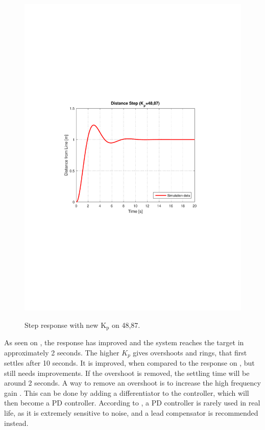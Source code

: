 \begin{figure}[H]
  \centering
  {
    \includegraphics[width=1.2\textwidth]{figures/distanceStep2.pdf}
  }
  \caption{Step response with new $\text{K}_\text{p}$ on 48,87.}
  \label{SimulationSteeringP2}
\end{figure}\vspace{-5mm}
As seen on , the response has improved and the system reaches the target in approximately 2 seconds. The higher $K_p$ gives overshoots and rings, that first settles after 10 seconds. It is improved, when compared to the response on , but still needs improvements. If the overshoot is removed, the settling time will be around 2 seconds. A way to remove an overshoot is to increase the high frequency gain \cite{KMNielsen}. This can be done by adding a differentiator to the controller, which will then become a PD controller. According to \cite{Franklin}, a PD controller is rarely used in real life, as it is extremely sensitive to noise, and a lead compensator is recommended instead.
